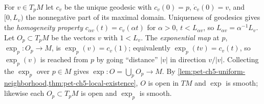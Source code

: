 \begin{definition}
  \label{def:pet-ch5-exponential-map}
  \leanok
  For $v\in T_pM$ let $c_v$ be the unique geodesic with $c_v(0)=p$, $\dot c_v(0)=v$,
  and $[0,L_v)$ the nonnegative part of its maximal domain. Uniqueness of geodesics
  gives the \emph{homogeneity property} $c_{\alpha v}(t)=c_v(\alpha t)$ for
  $\alpha>0$, $t<L_{\alpha v}$, so $L_{\alpha v}=\alpha^{-1}L_v$. Let $O_p\subset
  T_pM$ be the vectors $v$ with $1<L_v$. The \emph{exponential map} at $p$,
  $\exp_p:O_p\to M$, is $\exp_p(v)=c_v(1)$; equivalently $\exp_p(tv)=c_v(t)$, so
  $\exp_p(v)$ is reached from $p$ by going ``distance'' $|v|$ in direction $v/|v|$.
  Collecting the $\exp_p$ over $p\in M$ gives $\exp:O=\bigcup_pO_p\to M$. By
  \cref{lem:pet-ch5-uniform-neighborhood,thm:pet-ch5-local-existence}, $O$ is open in
  $TM$ and $\exp$ is smooth; likewise each $O_p\subset T_pM$ is open and $\exp_p$ is
  smooth.
\end{definition}

